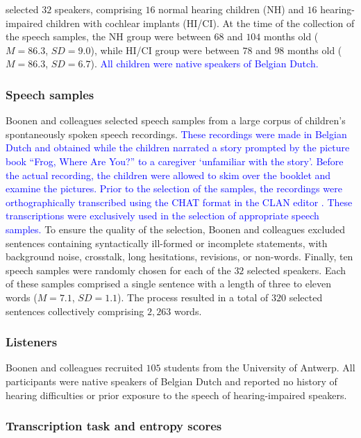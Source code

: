\documentclass[
  authoryear,
  preprint,
  1p]{elsarticle}
\begin{document}
\citet{Boonen_et_al_2021} selected \(32\) speakers, comprising \(16\)
normal hearing children (NH) and \(16\) hearing-impaired children with
cochlear implants (HI/CI). At the time of the collection of the speech
samples, the NH group were between \(68\) and \(104\) months old
(\(M=86.3\), \(SD=9.0\)), while HI/CI group were between \(78\) and
\(98\) months old (\(M=86.3\), \(SD=6.7\)). \textcolor{blue}{All children were native
speakers of Belgian Dutch.}

\subsubsection{Speech samples}\label{sec-M-SS}

Boonen and colleagues selected speech samples from a large corpus of
children's spontaneously spoken speech recordings. \textcolor{blue}{These recordings
were made in Belgian Dutch and obtained while the children narrated a
story prompted by the picture book ``Frog, Where Are You?''
\citep{Mayer_1969} to a caregiver `unfamiliar with the story'. Before
the actual recording, the children were allowed to skim over the booklet
and examine the pictures. Prior to the selection of the samples, the
recordings were orthographically transcribed using the CHAT format in
the CLAN editor \citep{MacWhinney_2020}. These transcriptions were
exclusively used in the selection of appropriate speech samples.} To
ensure the quality of the selection, Boonen and colleagues excluded
sentences containing syntactically ill-formed or incomplete statements,
with background noise, crosstalk, long hesitations, revisions, or
non-words. Finally, ten speech samples were randomly chosen for each of
the \(32\) selected speakers. Each of these samples comprised a single
sentence with a length of three to eleven words (\(M=7.1\), \(SD=1.1\)).
The process resulted in a total of \(320\) selected sentences
collectively comprising \(2,263\) words.

\subsubsection{Listeners}\label{sec-M-L}

Boonen and colleagues recruited \(105\) students from the University of
Antwerp. All participants were native speakers of Belgian Dutch and
reported no history of hearing difficulties or prior exposure to the
speech of hearing-impaired speakers.

\subsubsection{Transcription task and entropy scores}\label{sec-M-TS}
\end{document}
